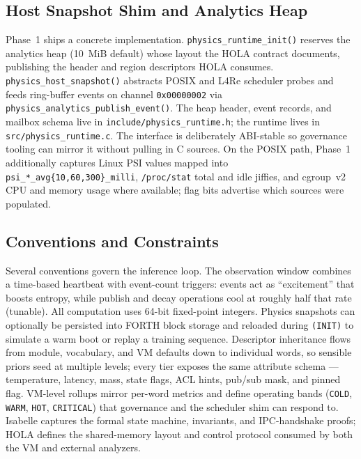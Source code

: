 \subsection{Host Snapshot Shim and Analytics Heap}

Phase~1 ships a concrete implementation. \texttt{physics\_runtime\_init()} reserves the
analytics heap (10~MiB default) whose layout the HOLA contract documents, publishing
the header and region descriptors HOLA consumes. \texttt{physics\_host\_snapshot()}
abstracts POSIX and L4Re scheduler probes and feeds ring-buffer events on channel
\texttt{0x00000002} via \texttt{physics\_analytics\_publish\_event()}. The heap header,
event records, and mailbox schema live in \texttt{include/physics\_runtime.h}; the
runtime lives in \texttt{src/physics\_runtime.c}. The interface is deliberately
ABI-stable so governance tooling can mirror it without pulling in C sources. On the
POSIX path, Phase~1 additionally captures Linux PSI values mapped into
\texttt{psi\_*\_avg\{10,60,300\}\_milli}, \texttt{/proc/stat} total and idle jiffies,
and cgroup~v2 CPU and memory usage where available; flag bits advertise which sources
were populated.

\subsection{Conventions and Constraints}

Several conventions govern the inference loop. The observation window combines a
time-based heartbeat with event-count triggers: events act as ``excitement'' that
boosts entropy, while publish and decay operations cool at roughly half that rate
(tunable). All computation uses 64-bit fixed-point integers. Physics snapshots can
optionally be persisted into FORTH block storage and reloaded during \texttt{(INIT)}
to simulate a warm boot or replay a training sequence. Descriptor inheritance flows
from module, vocabulary, and VM defaults down to individual words, so sensible priors
seed at multiple levels; every tier exposes the same attribute schema --- temperature,
latency, mass, state flags, ACL hints, pub/sub mask, and pinned flag. VM-level rollups
mirror per-word metrics and define operating bands (\texttt{COLD}, \texttt{WARM},
\texttt{HOT}, \texttt{CRITICAL}) that governance and the scheduler shim can respond to.
Isabelle captures the formal state machine, invariants, and IPC-handshake proofs;
HOLA defines the shared-memory layout and control protocol consumed by both the VM
and external analyzers.

